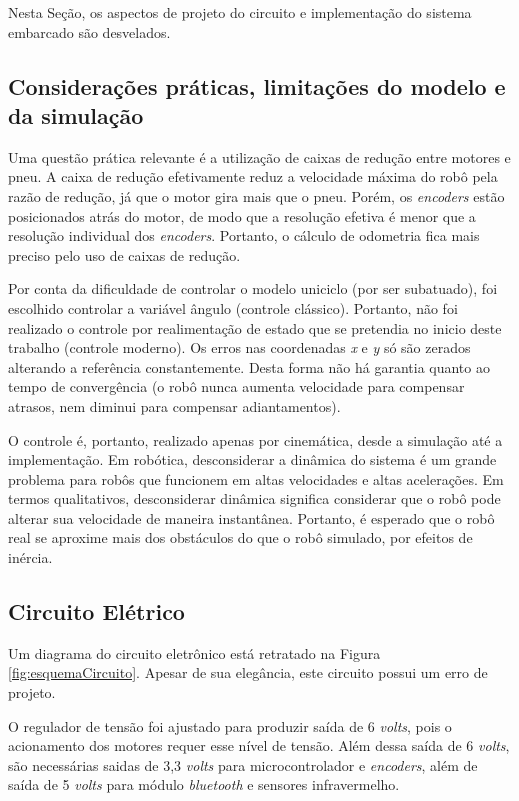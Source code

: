 	Nesta Seção, os aspectos de projeto do circuito e implementação do sistema embarcado 
	são desvelados.

	\subsection{Considerações práticas, limitações do modelo e da simulação}
	
	Uma questão prática relevante é a utilização de caixas de redução entre motores e pneu.
	A caixa de redução efetivamente reduz a velocidade máxima do robô pela razão de redução, 
	já que o motor gira mais que o pneu. Porém, os \textit{encoders} estão posicionados atrás 
	do motor, de modo que a resolução efetiva é menor que a resolução individual dos 
	\textit{encoders}. Portanto, o cálculo de odometria fica mais preciso pelo uso de caixas
	de redução.
	
	Por conta da dificuldade de controlar o modelo uniciclo (por ser subatuado), foi escolhido
	controlar a variável ângulo (controle clássico). Portanto, não foi realizado o controle 
	por realimentação de estado que se pretendia no inicio deste trabalho (controle moderno).
	Os erros nas coordenadas \textit{x} e \textit{y} só são zerados alterando a referência
	constantemente. Desta forma não há garantia quanto ao tempo de convergência (o
	robô nunca aumenta velocidade para compensar atrasos, nem diminui para compensar 
	adiantamentos). 
	
	O controle é, portanto, realizado apenas por cinemática, desde a simulação até a
	implementação. Em robótica, desconsiderar a dinâmica do sistema é um grande problema
	para robôs que funcionem em altas velocidades e altas acelerações. Em termos qualitativos,
	desconsiderar dinâmica significa considerar que o robô pode alterar sua velocidade de 
	maneira instantânea. Portanto, é esperado que o robô real se aproxime mais dos
	obstáculos do que o robô simulado, por efeitos de inércia. 

	\subsection{Circuito Elétrico}
	
	Um diagrama do circuito eletrônico está retratado na Figura \ref{fig:esquemaCircuito}. 
	Apesar de sua elegância, este circuito possui um erro de projeto.
	
	
	
	O regulador de tensão foi ajustado para produzir saída de 6 \textit{volts}, pois o 
	acionamento dos motores requer esse nível de tensão. Além dessa saída de 6 \textit{volts}, 
	são necessárias saidas de 3,3 \textit{volts} para microcontrolador e \textit{encoders}, 
	além de saída de 5 \textit{volts} para módulo \textit{bluetooth} e sensores infravermelho. 
	
